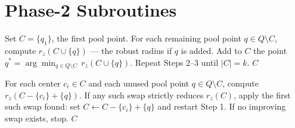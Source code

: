 \documentclass[twoside,leqno,twocolumn]{article}
\begin{document}
\appendix
\section{Phase-2 Subroutines}
\label{app:pseudocode}

\begin{algorithm}[t]
\caption{OC-Forward$(X, Q, k, z)$}
\label{alg:ocforward}
\begin{algorithmic}[1]
\State Set $C = \{q_1\}$, the first pool point.
\State For each remaining pool point $q \in Q \setminus C$, compute
       $r_z(C \cup \{q\})$ --- the robust radius if $q$ is added.
\State Add to $C$ the point $q^* = \arg\min_{q \in Q \setminus C}\,
       r_z(C \cup \{q\})$.
\State Repeat Steps 2--3 until $|C| = k$.
\State \Return $C$
\end{algorithmic}
\end{algorithm}

\begin{algorithm}[t]
\caption{OC-Local$(X, Q, C, z)$}
\label{alg:oclocal}
\begin{algorithmic}[1]
\State For each center $c_i \in C$ and each unused pool point
       $q \in Q \setminus C$, compute $r_z(C - \{c_i\} + \{q\})$.
\State If any such swap strictly reduces $r_z(C)$, apply the first
       such swap found: set $C \leftarrow C - \{c_i\} + \{q\}$ and
       restart Step 1.
\State If no improving swap exists, stop.
\State \Return $C$
\end{algorithmic}
\end{algorithm}



\end{document}
